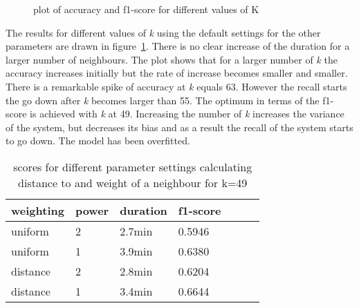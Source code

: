 \documentclass[11pt]{article}
\begin{document}
\begin{figure}
  \caption{plot of accuracy and f1-score for different values of K}
  \label{fig:tuning-knearest-k}
\end{figure}

The results for different values of \emph{k} using the default settings for the other parameters are drawn in figure~\ref{fig:tuning-knearest-k}. There is no clear increase of the duration for a larger number of neighbours. The plot shows that for a larger number of \emph{k} the accuracy increases initially but the rate of increase becomes smaller and smaller. There is a remarkable spike of accuracy at \emph{k} equals 63. However the recall starts the go down after \emph{k} becomes larger than 55. The optimum in terms of the f1-score is achieved with \emph{k} at 49. Increasing the number of \emph{k} increases the variance of the system, but decreases its bias and as a result the recall of the system starts to go down. The model has been overfitted.

\begin{table}[ht]\footnotesize
\centering
\begin{tabular}{ l l l l l l l }
weighting & power & duration & f1-score \\
\hline
uniform  & 2 & 2.7min & 0.5946 \\
uniform  & 1 & 3.9min & 0.6380 \\
distance & 2 & 2.8min & 0.6204 \\
distance & 1 & 3.4min & 0.6644 \\
\end{tabular}
\caption{scores for different parameter settings calculating distance to and weight of a neighbour for k=49}
\label{tab:tuning-knearest-dist}
\end{table}
\end{document}
